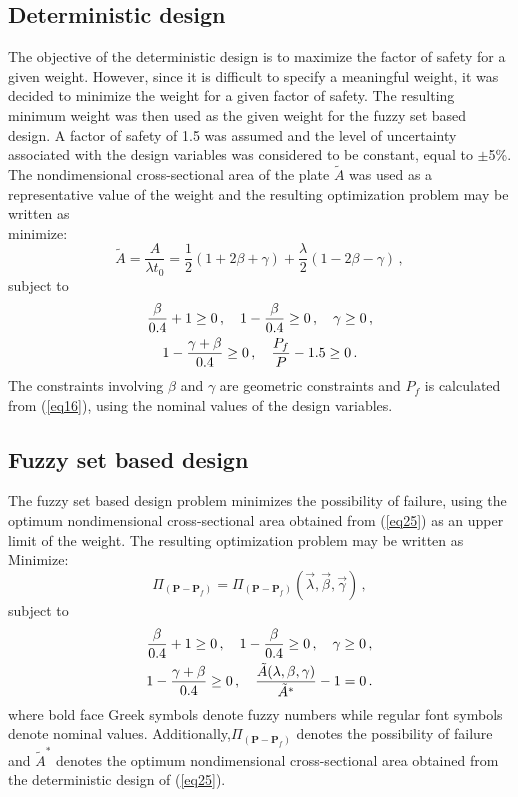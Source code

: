 \documentclass[stropt]{svjour}
\def\p{\mathbf{P}}%
\begin{document}

\subsection{Deterministic design}
\label{sec05.01}

The objective of the deterministic design is to maximize the factor of safety
for a given weight.
However, since it is difficult to specify a meaningful weight, it was decided
to minimize the weight for a given factor of safety.
The resulting minimum weight was then used as the given weight for the fuzzy
set based design.
A factor of safety of 1.5 was assumed and the level of uncertainty associated
with the design variables was considered to be constant, equal to $\pm$5\%.
The nondimensional cross-sectional area of the plate $\tilde{A}$ was used as
a representative value of the weight and the resulting optimization problem
may be written as\\[6pt]
minimize:
\[
\tilde{A}=\frac{A}{\lambda t_0}=\frac12 (1+2\beta+\gamma)+\frac{\lambda}{2}
(1-2\beta-\gamma)\, ,
\]
subject to
\begin{gather}
\frac{\beta}{0.4}+1\geq 0\, ,\quad
1-\frac{\beta}{0.4}\geq 0\, ,\quad
\gamma\geq 0\, ,\notag\\
1-\frac{\gamma+\beta}{0.4}\geq 0\, ,\quad
\frac{P_f}{P}-1.5\geq0\, .
\label{eq25}
\end{gather}
The constraints involving $\beta$ and $\gamma$ are geometric constraints and
$P_f$ is calculated from (\ref{eq16}), using the nominal values of the design
variables.


\subsection{Fuzzy set based design}
\label{sec05.02}

The fuzzy set based design problem minimizes the possibility of failure, using
the optimum nondimensional cross-sectional area obtained from (\ref{eq25}) as
an upper limit of the weight.
The resulting optimization problem may be written as\\[6pt]
Minimize:
\[
\Pi_{(\p-\p_f)}=\Pi_{(\p-\p_f)}({\vec{\lambda}}, {\vec{\beta}}, {\vec{\gamma}} )\, ,
\]
subject to
\begin{gather}
\frac{\beta}{0.4}+1\geq 0\, ,\quad
1-\frac{\beta}{0.4}\geq 0\, ,\quad
\gamma\geq 0\, ,\notag\\
1-\frac{\gamma+\beta}{0.4}\geq 0\, ,\quad
\frac{\tilde{A}(\lambda,\beta,\gamma)}{\tilde{A}^*}-1=0\, .
\label{eq26}
\end{gather}
where bold face Greek symbols denote fuzzy numbers while regular font symbols
denote nominal values.
Additionally,\linebreak[4]$\Pi_{(\p-\p_f)}$ denotes the possibility of
failure and
$\tilde{A}^*$ denotes the optimum nondimensional cross-sectional area
obtained from the deterministic design of (\ref{eq25}).
\end{document}
